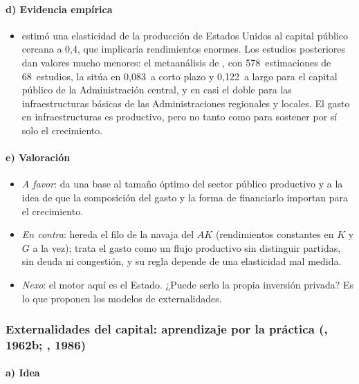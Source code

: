 \documentclass[11pt]{article}
\begin{document}
\paragraph{d) Evidencia empírica}

\begin{itemize}
\item \textcite{Aschauer1989Public} estimó una elasticidad de la producción de Estados Unidos al capital público cercana a 0,4, que implicaría rendimientos enormes. Los estudios posteriores dan valores mucho menores: el metaanálisis de \textcite{BomLigthart2014What}, con 578~estimaciones de 68~estudios, la sitúa en 0,083~a corto plazo y 0,122~a largo para el capital público de la Administración central, y en casi el doble para las infraestructuras básicas de las Administraciones regionales y locales. El gasto en infraestructuras es productivo, pero no tanto como para sostener por sí solo el crecimiento.
\end{itemize}

\paragraph{e) Valoración}

\begin{itemize}
\item \emph{A favor}: da una base al tamaño óptimo del sector público productivo y a la idea de que la composición del gasto y la forma de financiarlo importan para el crecimiento.
\item \emph{En contra}: hereda el filo de la navaja del $AK$ (rendimientos constantes en $K$ y $G$ a la vez); trata el gasto como un flujo productivo sin distinguir partidas, sin deuda ni congestión, y su regla depende de una elasticidad mal medida.
\item \emph{Nexo}: el motor aquí es el Estado. ¿Puede serlo la propia inversión privada? Es lo que proponen los modelos de externalidades.
\end{itemize}

\subsubsection{Externalidades del capital: aprendizaje por la práctica (, 1962b; , 1986)}\label{sec:externalidades}


\paragraph{a) Idea}
\end{document}

